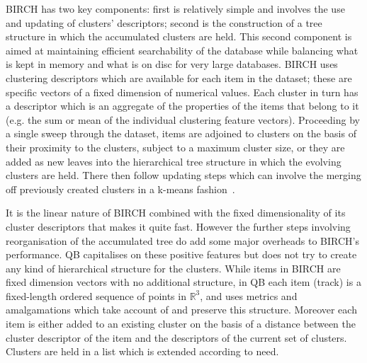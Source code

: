 \documentclass[preprint,authoryear,a4paper,10pt,onecolumn]{elsarticle}
\begin{document}
\begin{appendices}
BIRCH has two key components: first is relatively simple and involves
the use and updating of clusters' descriptors; second is the
construction of a tree structure in which the accumulated clusters are
held. This second component is aimed at maintaining efficient
searchability of the database while balancing what is kept in memory and
what is on disc for very large databases. BIRCH uses clustering
descriptors which are available for each item in the dataset; these are
specific vectors of a fixed dimension of numerical values. Each cluster
in turn has a descriptor which is an aggregate of the properties of the
items that belong to it (e.g. the sum or mean of the individual
clustering feature vectors). Proceeding by a single sweep through the
dataset, items are adjoined to clusters on the basis of their proximity
to the clusters, subject to a maximum cluster size, or they are added as
new leaves into the hierarchical tree structure in which the evolving
clusters are held. There then follow updating steps which can involve
the merging off previously created clusters in a k-means
fashion~\citep{steinhaus1956division,macqueen1967some}.

It is the linear nature of BIRCH combined with the fixed dimensionality
of its cluster descriptors that makes it quite fast. However the further
steps involving reorganisation of the accumulated tree do add some major
overheads to BIRCH's performance. QB capitalises on these positive
features but does not try to create any kind of hierarchical structure
for the clusters. While items in BIRCH are fixed dimension vectors with
no additional structure, in QB each item (track) is a fixed-length
ordered sequence of points in $\mathbb{R}^{3}$, and uses metrics and
amalgamations which take account of and preserve this structure.
Moreover each item is either added to an existing cluster on the basis
of a distance between the cluster descriptor of the item and the
descriptors of the current set of clusters. Clusters are held in a list
which is extended according to need.

\end{appendices}
\end{document}
